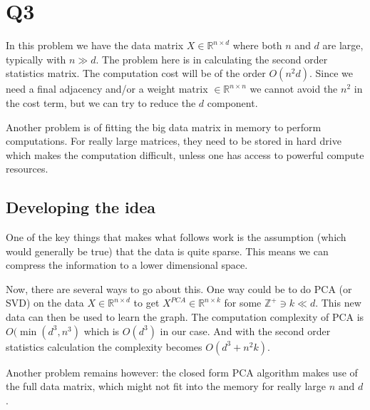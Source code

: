 \documentclass[11pt]{article}
\begin{document}
\section{Q3}
\label{sec:org3f21d58}
In this problem we have the data matrix \(X\in\mathbb{R}^{n\times d}\)
where both \(n\) and \(d\) are large, typically with \(n\gg d\). The
problem here is in calculating the second order statistics matrix. The
computation cost will be of the order \(O(n^2d)\). Since we need a
final adjacency and/or a weight matrix \(\in\mathbb{R}^{n\times n}\)
we cannot avoid the \(n^2\) in the cost term, but we can try to reduce
the \(d\) component.\par
Another problem is of fitting the big data matrix in memory to perform
computations. For really large matrices, they need to be stored in
hard drive which makes the computation difficult, unless one has
access to powerful compute resources.
\subsection{Developing the idea}
\label{sec:org4836409}
One of the key things that makes what follows work is the assumption
(which would generally be true) that the data is quite sparse. This
means we can compress the information to a lower dimensional
space.\par
Now, there are several ways to go about this. One way could be to do
PCA (or SVD) on the data \(X\in\mathbb{R}^{n\times d}\) to get
\(X^{PCA}\in\mathbb{R}^{n\times k}\) for some \(\mathbb{Z}^+\ni k \ll
d\). This new data can then be used to learn the graph. The
computation complexity of PCA is \(O(\min(d^3,n^3)\) which is
\(O(d^3)\) in our case. And with the second order statistics
calculation the complexity becomes \(O(d^3+n^2k)\).\par
Another problem remains however: the closed form PCA algorithm makes use of the
full data matrix, which might not fit into the memory for really large
\(n\text{ and }d\).
\end{document}
